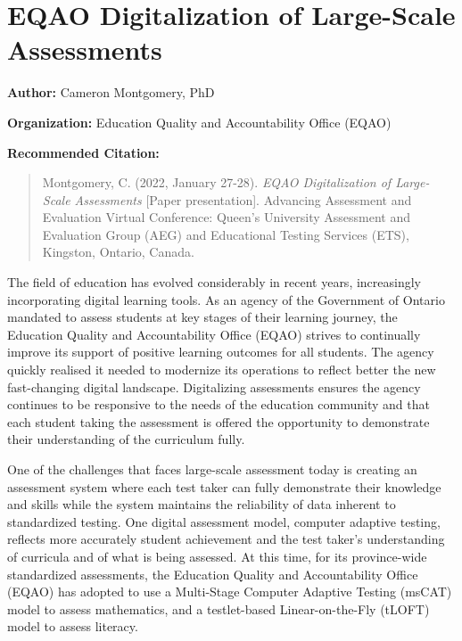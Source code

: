 \documentclass[
]{book}
\begin{document}
\newpage

\hypertarget{eqao-digitalization-of-large-scale-assessments}{%
\section{EQAO Digitalization of Large-Scale Assessments}\label{eqao-digitalization-of-large-scale-assessments}}

\textbf{Author:} Cameron Montgomery, PhD

\textbf{Organization:} Education Quality and Accountability Office (EQAO)

\textbf{Recommended Citation:}

\begin{quote}
Montgomery, C. (2022, January 27-28). \emph{EQAO Digitalization of Large-Scale Assessments} {[}Paper presentation{]}. Advancing Assessment and Evaluation Virtual Conference: Queen's University Assessment and Evaluation Group (AEG) and Educational Testing Services (ETS), Kingston, Ontario, Canada.
\end{quote}

The field of education has evolved considerably in recent years, increasingly incorporating digital learning tools. As an agency of the Government of Ontario mandated to assess students at key stages of their learning journey, the Education Quality and Accountability Office (EQAO) strives to continually improve its support of positive learning outcomes for all students. The agency quickly realised it needed to modernize its operations to reflect better the new fast-changing digital landscape. Digitalizing assessments ensures the agency continues to be responsive to the needs of the education community and that each student taking the assessment is offered the opportunity to demonstrate their understanding of the curriculum fully.

One of the challenges that faces large-scale assessment today is creating an assessment system where each test taker can fully demonstrate their knowledge and skills while the system maintains the reliability of data inherent to standardized testing. One digital assessment model, computer adaptive testing, reflects more accurately student achievement and the test taker's understanding of curricula and of what is being assessed. At this time, for its province-wide standardized assessments, the Education Quality and Accountability Office (EQAO) has adopted to use a Multi-Stage Computer Adaptive Testing (msCAT) model to assess mathematics, and a testlet-based Linear-on-the-Fly (tLOFT) model to assess literacy.
\end{document}
